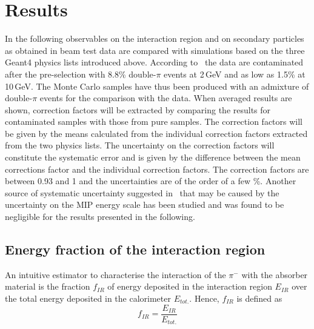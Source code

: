 \section{Results}
\label{sec:results}
In the following observables on the interaction region and on secondary particles as obtained in beam test data are compared with simulations based on the three {\sc Geant4} physics lists introduced above. According to~\cite{Bilki:2014uep} the data are contaminated after the pre-selection with 8.8\% double-$\pi$ events at 2\,GeV and as low as 1.5\% at 10\,GeV. The Monte Carlo samples have thus been produced with an admixture of double-$\pi$ events for the comparison with the data. When averaged results are shown, correction factors will be extracted by comparing the results for contaminated samples with those from pure samples.  The correction factors will be given by the means calculated from the individual correction factors extracted from the two physics lists. The uncertainty on the correction factors will constitute the systematic error and is given by the difference between the mean corrections factor and the individual correction factors. The correction factors are between 0.93 and 1 and the uncertainties are of the order of a few \%. Another source of systematic uncertainty suggested in~\cite{Adloff:2013vra} that may be caused by the uncertainty on the MIP energy scale has been studied and was found to be negligible for the results presented in the following.
\subsection{Energy fraction of the interaction region}
An intuitive estimator to characterise the interaction of the $\pi^-$  with the absorber material is the fraction $f_{IR}$ of energy deposited in the interaction region $E_{IR}$ over the total energy deposited in the calorimeter $E_{tot.}$. Hence, $f_{IR}$  is defined as
\begin{equation}
f_{IR} = \frac{E_{IR}}{E_{tot.}}
\end{equation}

